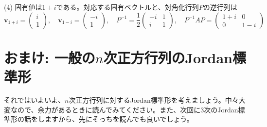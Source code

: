 (4) 固有値は$1 \pm i$である。対応する固有ベクトルと、対角化行列$P$の逆行列は
\[
\bm{v}_{1 + i} = 
\begin{pmatrix}
i \\
1
\end{pmatrix}, \quad
\bm{v}_{1 - i} = 
\begin{pmatrix}
-i \\
1
\end{pmatrix}, \quad
P^{-1} = 
\frac{1}{2}
\begin{pmatrix}
-i & 1 \\
i & 1
\end{pmatrix}, \quad
P^{-1} AP =
\begin{pmatrix}
1 + i & 0 \\
0 & 1 - i
\end{pmatrix}
\]

\section{おまけ: 一般の$n$次正方行列のJordan標準形}

それではいよいよ、$n$次正方行列に対するJordan標準形を考えましょう。中々大変なので、余力があるときに読んでみてください。また、次回に$3$次のJordan標準形の話をしますから、先にそっちを読んでも良いでしょう。

